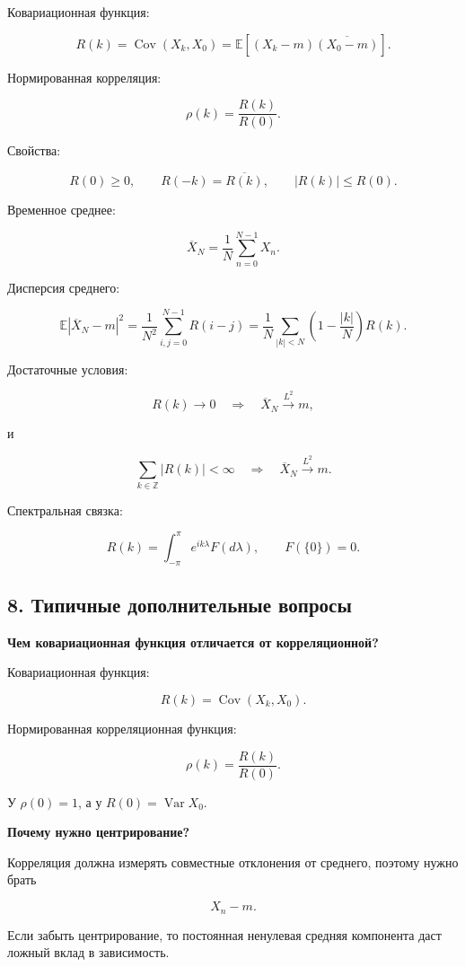 \documentclass[
  11pt,
  a4paper,
]{article}
\begin{document}
Ковариационная функция:

\[
R(k)=\operatorname{Cov}(X_k,X_0)
=
\mathbb E[(X_k-m)\overline{(X_0-m)}].
\]

Нормированная корреляция:

\[
\rho(k)=\frac{R(k)}{R(0)}.
\]

Свойства:

\[
R(0)\ge0,
\qquad
R(-k)=\overline{R(k)},
\qquad
|R(k)|\le R(0).
\]

Временное среднее:

\[
\overline X_N=\frac1N\sum_{n=0}^{N-1}X_n.
\]

Дисперсия среднего:

\[
\mathbb E|\overline X_N-m|^2
=
\frac1{N^2}
\sum_{i,j=0}^{N-1}R(i-j)
=
\frac1N
\sum_{|k|<N}
\left(1-\frac{|k|}{N}\right)R(k).
\]

Достаточные условия:

\[
R(k)\to0
\quad\Rightarrow\quad
\overline X_N\xrightarrow{L^2}m,
\]

и

\[
\sum_{k\in\mathbb Z}|R(k)|<\infty
\quad\Rightarrow\quad
\overline X_N\xrightarrow{L^2}m.
\]

Спектральная связка:

\[
R(k)=\int_{-\pi}^{\pi}e^{ik\lambda}F(d\lambda),
\qquad
F(\{0\})=0.
\]

\subsection{8. Типичные дополнительные
вопросы}\label{ux442ux438ux43fux438ux447ux43dux44bux435-ux434ux43eux43fux43eux43bux43dux438ux442ux435ux43bux44cux43dux44bux435-ux432ux43eux43fux440ux43eux441ux44b}

\textbf{Чем ковариационная функция отличается от корреляционной?}

Ковариационная функция:

\[
R(k)=\operatorname{Cov}(X_k,X_0).
\]

Нормированная корреляционная функция:

\[
\rho(k)=\frac{R(k)}{R(0)}.
\]

У \(\rho(0)=1\), а у \(R(0)=\operatorname{Var}X_0\).

\textbf{Почему нужно центрирование?}

Корреляция должна измерять совместные отклонения от среднего, поэтому
нужно брать

\[
X_n-m.
\]

Если забыть центрирование, то постоянная ненулевая средняя компонента
даст ложный вклад в зависимость.
\end{document}
